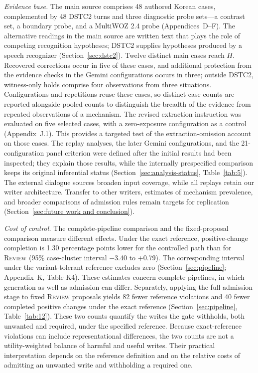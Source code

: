 \documentclass[acmsmall,review,anonymous]{acmart}
\newcommand{\review}{\textsc{Review}}
\begin{document}
\emph{Evidence base.} The main source comprises 48 authored Korean cases, complemented by 48 DSTC2 turns and three diagnostic probe sets---a contrast set, a boundary probe, and a MultiWOZ 2.4 probe (Appendices~D--F). The alternative readings in the main source are written text that plays the role of competing recognition hypotheses; DSTC2 supplies hypotheses produced by a speech recognizer (Section~\ref{sec:dstc2}). Twelve distinct main cases reach $H$. Recovered corrections occur in five of these cases, and additional protection from the evidence checks in the Gemini configurations occurs in three; outside DSTC2, witness-only holds comprise four observations from three situations. Configurations and repetitions reuse these cases, so distinct-case counts are reported alongside pooled counts to distinguish the breadth of the evidence from repeated observations of a mechanism. The revised extraction instruction was evaluated on five selected cases, with a zero-exposure configuration as a control (Appendix~J.1). This provides a targeted test of the extraction-omission account on those cases. The replay analyses, the later Gemini configurations, and the 21-configuration panel criterion were defined after the initial results had been inspected; they explain those results, while the internally prespecified comparison keeps its original inferential status (Section~\ref{sec:analysis-status}, Table~\ref{tab:5}). The external dialogue sources broaden input coverage, while all replays retain our writer architecture. Transfer to other writers, estimates of mechanism prevalence, and broader comparisons of admission rules remain targets for replication (Section~\ref{sec:future work and conclusion}).

\emph{Cost of control.} The complete-pipeline comparison and the fixed-proposal comparison measure different effects. Under the exact reference, positive-change completion is 1.30 percentage points lower for the controlled path than for \review{} (95\% case-cluster interval $-$3.40 to +0.79). The corresponding interval under the variant-tolerant reference excludes zero (Section~\ref{sec:pipeline}; Appendix~K, Table K4). These estimates concern complete pipelines, in which generation as well as admission can differ. Separately, applying the full admission stage to fixed \review{} proposals yields 82 fewer reference violations and 40 fewer completed positive changes under the exact reference (Section~\ref{sec:pipeline}, Table~\ref{tab:12}). These two counts quantify the writes the gate withholds, both unwanted and required, under the specified reference. Because exact-reference violations can include representational differences, the two counts are not a utility-weighted balance of harmful and useful writes. Their practical interpretation depends on the reference definition and on the relative costs of admitting an unwanted write and withholding a required one.
\end{document}
